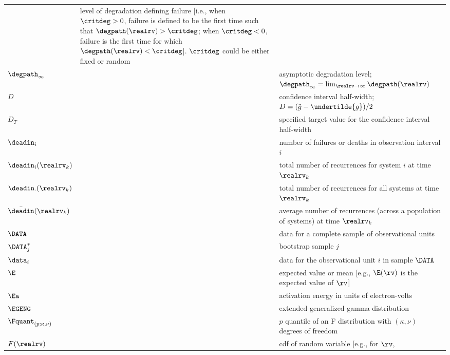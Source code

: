 \begin{supertabular}{p{0.9in}lp{4.0in}}
&level of degradation defining failure [i.e., 
when $\critdeg>0$, failure is 
defined to be the first time such that $\degpath(\realrv)>\critdeg$;
when $\critdeg<0$, failure is the
first time for which
$\degpath(\realrv)<\critdeg$]. $\critdeg$ could be either fixed or 
random
   \\
$\degpath_{\infty}$ &
&asymptotic degradation level; $\degpath_{\infty}=
\lim_{\realrv \to\infty} \degpath(\realrv)$
  \\
$D$ & 
& confidence interval half-width;
$D=(\tilde{g}-\undertilde{g})/2$
  \\[-2ex]
$D_{T}$ & 
&   specified target value for the 
    confidence interval half-width 
   \\
$\deadin_{i}$ & 
& number of failures or deaths in observation interval $i$
   \\
$\deadin_{i}(\realrv_{k})$ 
     &
     & 
total number
of recurrences for system $i$ at time $\realrv_{k}$
    \\
$\deadin_{\cdot}(\realrv_{k})$ 
     &
     & 
total number of recurrences for all systems at time $\realrv_{k}$
     \\
$\bar{\deadin}(\realrv_{k})$ 
     &
     & 
average number of recurrences (across a population of systems)
at time $\realrv_{k}$
   \\
$\DATA$   &
& data for a complete sample of observational units 
  \\
$\DATA^{*}_{j}$   &
& bootstrap sample $j$
  \\
$\data_{i}$   &
&  data for the  observational unit $i$
in sample $\DATA$
\\
$\E$       & 
& expected value or mean [e.g., $\E(\rv)$ is the expected value of $\rv$]
\\
$\Ea$       & 
& activation energy in units of electron-volts
   \\
$\EGENG$ & 
& extended generalized gamma distribution
  \\
$\Fquant_{(p;\kappa, \nu)} $  &  
    &
$p$ quantile  of an F distribution with 
$(\kappa, \nu)$ degrees of freedom
   \\
$F(\realrv)$  &  
    &                            
  cdf of random variable [e.g., for $\rv$,

\end{supertabular}
